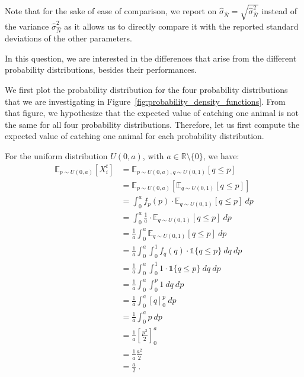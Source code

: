 \documentclass{article}
\begin{document}
Note that for the sake of ease of comparison, we report on $\hat{\sigma}_{\hat{N}} = \sqrt{\hat{\sigma}_{\hat{N}}^2}$ instead of the variance $\hat{\sigma}_{\hat{N}}^2$ as it allows us to directly compare it with the reported standard deviations of the other parameters.


In this question, we are interested in the differences that arise from the different probability distributions, besides their performances. 

We first plot the probability distribution for the four probability distributions that we are investigating in Figure~\ref{fig:probability_density_functions}. From that figure, we hypothesize that the expected value of catching one animal is not the same for all four probability distributions. Therefore, let us first compute the expected value of catching one animal for each probability distribution. 

For the uniform distribution $U(0, a)$, with $a\in \mathbb{R}\setminus \{0\}$, we have:
\begin{align*}
    \mathbb{E}_{p \sim U(0, a)}[X_i^t] &= \mathbb{E}_{p \sim U(0, a), q\sim U(0, 1)}\left[ q \leq p \right] \\
    &= \mathbb{E}_{p \sim U(0, a)}\left[ \mathbb{E}_{q\sim U(0, 1)} \left[ q \leq p \right] \right] \\
    &= \int_0^a f_p(p) \cdot \mathbb{E}_{q\sim U(0, 1)} \left[ q \leq p \right] \  dp \\ 
    &= \int_0^a \frac{1}{a} \cdot \mathbb{E}_{q\sim U(0, 1)} \left[ q \leq p \right] \  dp \\ 
    &= \frac{1}{a} \int_0^a \mathbb{E}_{q\sim U(0, 1)} \left[ q \leq p \right] \  dp \\ 
    &= \frac{1}{a} \int_0^a \int_0^1 f_q(q) \cdot \mathbb{1}\{q \leq p\} \ dq \  dp \\
    &= \frac{1}{a} \int_0^a \int_0^1 1 \cdot \mathbb{1}\{q \leq p\} \ dq \  dp \\
    &= \frac{1}{a} \int_0^a \int_0^p 1 \ dq \  dp \\
    &= \frac{1}{a} \int_0^a {\left[ q \right]}_0^p \  dp \\
    &= \frac{1}{a} \int_0^a p \  dp \\
    &= \frac{1}{a} {\left[ \frac{p^2}{2} \right]}_0^a \\
    &= \frac{1}{a} \frac{a^2}{2} \\
    &= \frac{a}{2} \;.
\end{align*}
\end{document}
